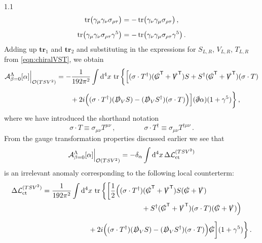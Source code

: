 \documentclass[a4paper,12pt]{article}
\def\L{{\cal L}}
\def\O{{\cal O}}
\def\Acal{{\cal A}}
\def\T{\textsf{T}}
\def\Dsl{\slashed{D}}
\def\Gsl{\slashed{G}}
\def\pdsl{\slashed\partial}
\def\Vsl{\slashed{V}}
\def\btr{\mathbf{tr}}
\begin{document}
\begin{spacing}{1.1}
\begin{subequations}
\begin{align}
\tr\bigl(\gamma_\mu \gamma_\nu \sigma_{\rho\tau} \bigr) &= -\tr\bigl(\gamma_\nu \gamma_\mu \sigma_{\rho\tau} \bigr) \,,\\[5pt]
\tr\bigl(\gamma_\mu \gamma_\nu \sigma_{\rho\tau} \gamma^5\bigr) &= -\tr\bigl(\gamma_\nu \gamma_\mu \sigma_{\rho\tau} \gamma^5\bigr) \,.
\end{align}
\end{subequations}
Adding up $\btr_1$ and $\btr_2$ and substituting in the expressions for $S_{L,R}$, $V_{L,R}$, $T_{L,R}$ from \cref{eqn:chiralVST}, we obtain
\begin{align}
\Acal_{\beta=0}^\Lambda[\alpha]\Bigr|_{\O(TSV^2)} &= - \frac{1}{192\pi^2} \int \dd^4x\, \tr \bigg\{ \Big[
(\sigma\cdot T^\dagger) ( \Gsl^\T+\Vsl^\T ) S + S^\dagger ( \Gsl^\T + \Vsl^\T ) (\sigma\cdot T)
\notag\\[5pt]
&\hspace{20pt}
+ 2i \Big( (\sigma\cdot T^\dagger) (\Dsl_V S ) - ( \Dsl_V S^\dagger) (\sigma\cdot T) \Big)
\Big] (\pdsl \alpha) (1+\gamma^5) \bigg\} \,,
\end{align}
where we have introduced the shorthand notation
\begin{equation}
\sigma\cdot T \equiv \sigma_{\mu\nu} T^{\mu\nu} \,,\qquad
\qquad
\sigma\cdot T^\dagger \equiv \sigma_{\mu\nu} T^{\dagger\mu\nu} \,.
\end{equation}
From the gauge transformation properties discussed earlier we see that
\begin{equation}
\Acal_{\beta=0}^\Lambda[\alpha]\Bigr|_{\O(TSV^2)} = -\delta_\alpha \int \dd^4x \,\Delta\L_\text{ct}^{(TSV^2)} 
\end{equation}
is an irrelevant anomaly corresponding to the following local counterterm:
\begin{align}
\Delta\L_\text{ct}^{(TSV^2)} &= \frac{1}{192\pi^2} \int \dd^4x\, \tr \bigg\{ \bigg[
\frac12 \Bigl( (\sigma\cdot T^\dagger) ( \Gsl^\T + \Vsl^\T ) S ( \Gsl + \Vsl ) 
\notag\\
&\hspace{140pt}
+ S^\dagger ( \Gsl^\T + \Vsl^\T ) (\sigma\cdot T) ( \Gsl + \Vsl ) \Bigr)
\notag\\[5pt]
&\hspace{65pt}
+ 2i\Big( (\sigma\cdot T^\dagger) (\Dsl_V S ) - ( \Dsl_V S^\dagger ) (\sigma\cdot T)
\Big) \Gsl \bigg] (1+\gamma^5) \bigg\} \,.
\label{eq:LctTSV2}
\end{align}


\end{spacing}
\end{document}
